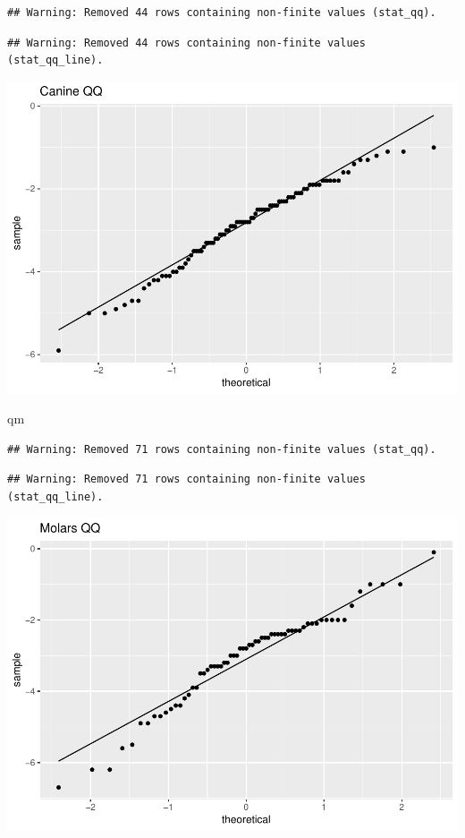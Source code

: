 \documentclass[]{article}
\newenvironment{Shaded}{\begin{snugshade}}{\end{snugshade}}
\newcommand{\NormalTok}[1]{#1}
\begin{document}
\begin{verbatim}
## Warning: Removed 44 rows containing non-finite values (stat_qq).
\end{verbatim}

\begin{verbatim}
## Warning: Removed 44 rows containing non-finite values (stat_qq_line).
\end{verbatim}

\includegraphics{img/unnamed-chunk-8-1.pdf}

\begin{Shaded}
\begin{Highlighting}[]
\NormalTok{qm}
\end{Highlighting}
\end{Shaded}

\begin{verbatim}
## Warning: Removed 71 rows containing non-finite values (stat_qq).
\end{verbatim}

\begin{verbatim}
## Warning: Removed 71 rows containing non-finite values (stat_qq_line).
\end{verbatim}

\includegraphics{img/unnamed-chunk-8-2.pdf}
\end{document}
